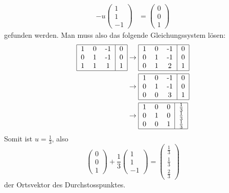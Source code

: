 \begin{loesung}
\begin{align*}
-u\begin{pmatrix}1\\1\\-1\end{pmatrix}
&=
\begin{pmatrix}0\\0\\1\end{pmatrix}
\end{align*}
gefunden werden.
Man muss also das folgende Gleichungssystem lösen:
\begin{align*}
\begin{tabular}{|ccc|c|}
\hline
1&0&-1&0\\
0&1&-1&0\\
1&1&1&1\\
\hline
\end{tabular}
&\rightarrow
\begin{tabular}{|ccc|c|}
\hline
1&0&-1&0\\
0&1&-1&0\\
0&1&2&1\\
\hline
\end{tabular}
\\
&\rightarrow
\begin{tabular}{|ccc|c|}
\hline
1&0&-1&0\\
0&1&-1&0\\
0&0&3&1\\
\hline
\end{tabular}
\\
&\rightarrow
\begin{tabular}{|ccc|c|}
\hline
1&0&0&$\frac13$\\
0&1&0&$\frac13$\\
0&0&1&$\frac13$\\
\hline
\end{tabular}
\end{align*}
Somit ist $u=\frac13$, also
\[
\begin{pmatrix}0\\0\\1\end{pmatrix}+\frac13\begin{pmatrix}1\\1\\-1\end{pmatrix}
=
\begin{pmatrix}\frac13\\\frac13\\\frac23\end{pmatrix}
\]
der Ortsvektor des Durchstosspunktes.


\end{loesung}
